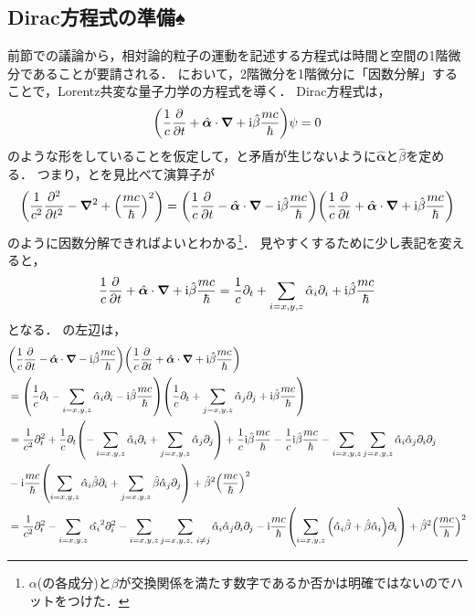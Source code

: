 \documentclass{report}
\begin{document}
  \subsection{Dirac方程式の準備♠}
    前節での議論から，相対論的粒子の運動を記述する方程式は時間と空間の1階微分であることが要請される．
    において，2階微分を1階微分に「因数分解」することで，Lorentz共変な量子力学の方程式を導く．
    Dirac方程式は，
    \begin{align}
      \qty(\frac{1}{c}\pdv{t} + \hat{\bm{\alpha}} \cdot \grad + \mathrm{i}\hat{\beta} \frac{mc}{\hbar})\psi = 0 \label{Dirac-pre}
    \end{align}
    のような形をしていることを仮定して，と矛盾が生じないように$\hat{\bm{\alpha}}$と$\hat{\beta}$を定める．
    つまり，とを見比べて演算子が
    \begin{align}
      \qty(\frac{1}{c^2}\pdv[2]{t} - \grad^2 + \qty(\frac{mc}{\hbar})^2) = \qty(\frac{1}{c}\pdv{t} - \hat{\bm{\alpha}} \cdot \grad - \mathrm{i}\hat{\beta} \frac{mc}{\hbar})\qty(\frac{1}{c}\pdv{t} + \hat{\bm{\alpha}} \cdot \grad + \mathrm{i}\hat{\beta} \frac{mc}{\hbar})
    \end{align}
    のように因数分解できればよいとわかる\footnote{$\alpha$(の各成分)と$\beta$が交換関係を満たす数字であるか否かは明確ではないのでハットをつけた．}．
    見やすくするために少し表記を変えると，
    \begin{align}
      \frac{1}{c}\pdv{t} + \hat{\bm{\alpha}} \cdot \grad + \mathrm{i}\hat{\beta} \frac{mc}{\hbar} = \frac{1}{c}\partial_t + \sum_{i = x, y, z} \hat{\alpha}_i \partial_i + \mathrm{i}\hat{\beta} \frac{mc}{\hbar}
    \end{align}
    となる．
    の左辺は，
    \begin{align}
      &\qty(\frac{1}{c}\pdv{t} - \hat{\bm{\alpha}} \cdot \grad - \mathrm{i}\hat{\beta} \frac{mc}{\hbar})\qty(\frac{1}{c}\pdv{t} + \hat{\bm{\alpha}} \cdot \grad + \mathrm{i}\hat{\beta} \frac{mc}{\hbar}) \\
      &=\qty(\frac{1}{c}\partial_t - \sum_{i = x, y, z} \hat{\alpha}_i \partial_i - \mathrm{i}\hat{\beta} \frac{mc}{\hbar}) \qty(\frac{1}{c}\partial_t + \sum_{j = x, y, z} \hat{\alpha}_j \partial_j + \mathrm{i}\hat{\beta} \frac{mc}{\hbar})\\
      &= \frac{1}{c^2}\partial_t^2 + \frac{1}{c} \partial_t \qty(-\sum_{i = x, y, z} \hat{\alpha}_i \partial_i + \sum_{j = x,y,z} \hat{\alpha}_j \partial_j) + \frac{1}{c}\mathrm{i}\hat{\beta}\frac{mc}{\hbar} - \frac{1}{c}\mathrm{i}\hat{\beta}\frac{mc}{\hbar} 
      - \sum_{i = x, y, z} \sum_{j = x, y, z} \hat{\alpha}_i \hat{\alpha}_j \partial_i \partial_j\\ 
      &-\mathrm{i}\frac{mc}{\hbar}\qty(\sum_{i = x, y, z} \hat{\alpha}_i \hat{\beta} \partial_i + \sum_{j = x, y, z} \hat{\beta} \hat{\alpha}_j \partial_j)
      + \hat{\beta}^2\qty(\frac{mc}{\hbar})^2\\
      &= \frac{1}{c^2}\partial_t^2 - \sum_{i = x, y, z} \hat{\alpha_i}^2 \partial_i^2 - \sum_{i = x, y, z} \sum_{j = x, y, z,\ i \neq j} \hat{\alpha}_i \hat{\alpha}_j \partial_i \partial_j
      -\mathrm{i}\frac{mc}{\hbar}\qty(\sum_{i = x, y, z} \qty( \hat{\alpha}_i \hat{\beta} + \hat{\beta} \hat{\alpha}_i )\partial_i) + \hat{\beta}^2\qty(\frac{mc}{\hbar})^2
    \end{align}
\end{document}
